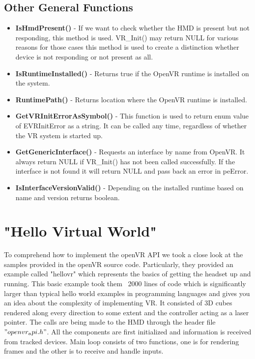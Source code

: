 \documentclass[journal]{IEEEtran}
\begin{document}
\subsection{Other General Functions}

\begin{itemize}
	\item \textbf{IsHmdPresent()} - 
	If we want to check whether the HMD is present but not responding, this method is used. VR\_Init() may return NULL for various reasons for those cases this method is used to create a distinction whether device is not responding or not present as all.
	
	\item \textbf{IsRuntimeInstalled()} - 
	Returns true if the OpenVR runtime is installed on the system.
	
	\item \textbf{RuntimePath()} - 
	Returns location where the OpenVR runtime is installed.
	
	\item \textbf{GetVRInitErrorAsSymbol()} - This function is used to return enum value of EVRInitError as a string. It can be called any time, regardless of whether the VR system is started up.
	
	\item \textbf{GetGenericInterface()} - Requests an interface by name from OpenVR. It always return NULL if VR\_Init() has not been called successfully. If the interface is not found it will return NULL and pass back an error in peError. 
	
	\item \textbf{IsInterfaceVersionValid()} - 
	Depending on the installed runtime based on name and version returns boolean.
	
\end{itemize}

\section{"Hello Virtual World"}


To comprehend how to implement the openVR API we took a close look at the samples provided in the openVR source code. Particularly, they provided an example called "hellovr" which represents the basics of getting the headset up and running. This basic example took them ~2000 lines of code which is significantly larger than typical hello world examples in programming languages and gives you an idea about the complexity of implementing VR. It consisted of 3D cubes rendered along every direction to some extent and the controller acting as a laser pointer. The calls are being made to the HMD through the header file $"openvr_api.h"$. All the components are first initialized and information is received from tracked devices. Main loop consists of two functions, one is for rendering frames and the other is to receive and handle inputs. 
\end{document}

